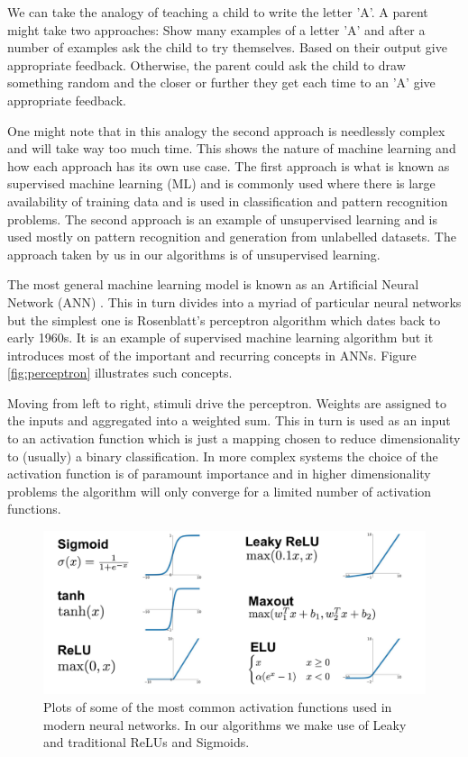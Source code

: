 \documentclass[11pt]{article} %
\begin{document}
We can take the analogy of teaching a child to write the letter 'A'. A parent might take two approaches: Show many examples of a letter 'A' and after a number of examples ask the child to try themselves. Based on their output give appropriate feedback.
Otherwise, the parent could ask the child to draw something random and the closer or further they get each time to an 'A' give appropriate feedback.
\newline

One might note that in this analogy the second approach is needlessly complex and will take way too much time. This shows the nature of machine learning and how each approach has its own use case. The first approach is what is known as supervised machine learning (ML) and is commonly used where there is large availability of training data and is used in classification and pattern recognition problems. The second approach is an example of unsupervised learning and is used mostly on pattern recognition and generation from unlabelled datasets. The approach taken by us in our algorithms is of unsupervised learning.
\newline

The most general machine learning model is known as an Artificial Neural Network (ANN) \cite{ANN}.
This in turn divides into a myriad of particular neural networks but the simplest one is Rosenblatt’s perceptron \cite{rosenblatt1961principles} algorithm which dates back to early 1960s.
It is an example of supervised machine learning algorithm but it introduces most of the important and recurring concepts in ANNs. Figure \ref{fig:perceptron} illustrates such concepts.
\newline

Moving from left to right, stimuli drive the perceptron.
Weights are assigned to the inputs and aggregated into a weighted sum.
This in turn is used as an input to an activation function which is just a mapping chosen to reduce dimensionality to (usually) a binary classification.
In more complex systems the choice of the activation function is of paramount importance and in higher dimensionality problems the algorithm will only converge for a limited number of activation functions.
\begin{figure}[H]
\centering
\includegraphics[scale=0.35]{images/activation_functions.png}
\caption{\cite{activationfuncs} Plots of some of the most common activation functions used in modern neural networks. In our algorithms we make use of Leaky and traditional ReLUs and Sigmoids.}
\label{fig:activation_functions}
\end{figure}
\end{document}

